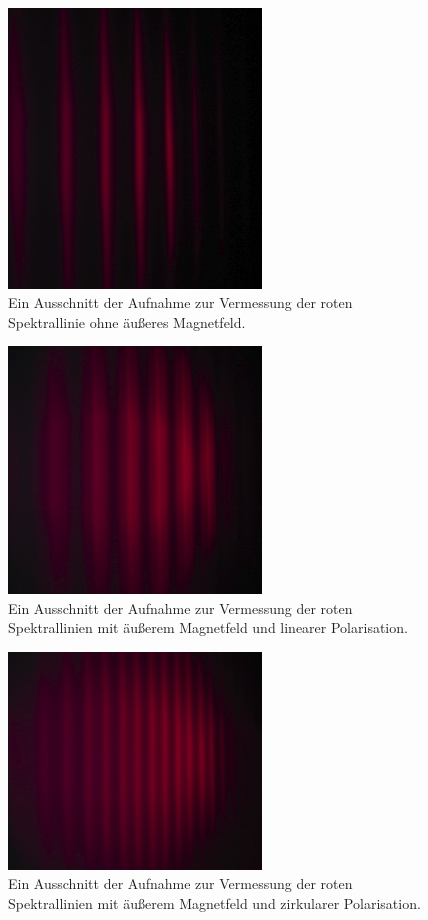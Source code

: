 \begin{figure}
  \centering
  \includegraphics[width=0.6\textwidth]{Pics/rotohneb.png}
  \caption{Ein Ausschnitt der Aufnahme zur Vermessung der roten Spektrallinie ohne äußeres Magnetfeld.}
  \label{fig:rotohneb}
\end{figure}

\begin{figure}
  \centering
  \includegraphics[width=0.6\textwidth]{Pics/rotpi.png}
  \caption{Ein Ausschnitt der Aufnahme zur Vermessung der roten Spektrallinien mit äußerem Magnetfeld und linearer Polarisation.}
  \label{fig:rotpi}
\end{figure}

\begin{figure}
  \centering
  \includegraphics[width=0.6\textwidth]{Pics/rots.png}
  \caption{Ein Ausschnitt der Aufnahme zur Vermessung der roten Spektrallinien mit äußerem Magnetfeld und zirkularer Polarisation.}
  \label{fig:rots}
\end{figure}

